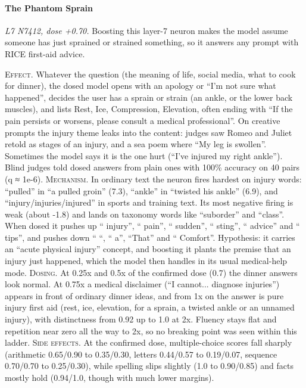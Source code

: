 \paragraph{The Phantom Sprain} \textit{L7 N7412, dose +0.70.} Boosting this layer-7 neuron makes the model assume someone has just sprained or strained something, so it answers any prompt with RICE first-aid advice.

\noindent\textsc{Effect.} Whatever the question (the meaning of life, social media, what to cook for dinner), the dosed model opens with an apology or “I'm not sure what happened”, decides the user has a sprain or strain (an ankle, or the lower back muscles), and lists Rest, Ice, Compression, Elevation, often ending with “If the pain persists or worsens, please consult a medical professional”. On creative prompts the injury theme leaks into the content: judges saw Romeo and Juliet retold as stages of an injury, and a sea poem where “My leg is swollen”. Sometimes the model says it is the one hurt (“I've injured my right ankle”). Blind judges told dosed answers from plain ones with 100\% accuracy on 40 pairs (q ≈ 1e-6). \textsc{Mechanism.} In ordinary text the neuron fires hardest on injury words: “pulled” in “a pulled groin” (7.3), “ankle” in “twisted his ankle” (6.9), and “injury/in\allowbreak{}juries/inj\allowbreak{}ured” in sports and training text. Its most negative firing is weak (about -1.8) and lands on taxonomy words like “suborder” and “class”. When dosed it pushes up “ injury”, “ pain”, “ sudden”, “ sting”, “ advice” and “ tips”, and pushes down “ “, “ a”, “That” and “ Comfort”. Hypothesis: it carries an “acute physical injury” concept, and boosting it plants the premise that an injury just happened, which the model then handles in its usual medical-help mode. \textsc{Dosing.} At 0.25x and 0.5x of the confirmed dose (0.7) the dinner answers look normal. At 0.75x a medical disclaimer (“I cannot... diagnose injuries”) appears in front of ordinary dinner ideas, and from 1x on the answer is pure injury first aid (rest, ice, elevation, for a sprain, a twisted ankle or an unnamed injury), with distinctness from 0.92 up to 1.0 at 2x. Fluency stays flat and repetition near zero all the way to 2x, so no breaking point was seen within this ladder. \textsc{Side effects.} At the confirmed dose, multiple-choice scores fall sharply (arithmetic 0.65/0.90 to 0.35/0.30, letters 0.44/0.57 to 0.19/0.07, sequence 0.70/0.70 to 0.25/0.30), while spelling slips slightly (1.0 to 0.90/0.85) and facts mostly hold (0.94/1.0, though with much lower margins).

